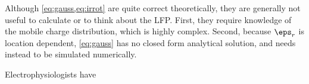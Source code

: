 Although \cref{eq:gauss,eq:irrot} are quite correct theoretically, they are generally not useful to calculate or to think about the LFP. First, they require knowledge of the mobile charge distribution, which is highly complex.\footnotemark{} Second, because $\eps_r$ is location dependent, \cref{eq:gauss} has no closed form analytical solution, and needs instead to be simulated numerically.



Electrophysiologists have 

